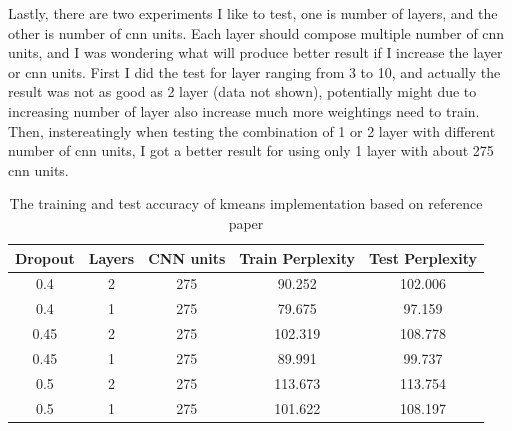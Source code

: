 \documentclass{article}
\begin{document}
Lastly, there are two experiments I like to test, one is number of layers, and the other is number of cnn units. Each layer should compose multiple number of cnn units, and I was wondering what will produce better result if I increase the layer or cnn units. First I did the test for layer ranging from 3 to 10, and actually the result was not as good as 2 layer (data not shown), potentially might due to increasing number of layer also increase much more weightings need to train. Then, instereatingly when testing the combination of 1 or 2 layer with different number of cnn units, I got a better result for using only 1 layer with about 275 cnn units.

\begin{table}[h]
\begin{center}
    \begin{tabular}{| c | c | c | c | c |}
    \hline
    Dropout & Layers & CNN units & Train Perplexity & Test Perplexity\\ \hline
    0.4 & 2 & 275 & 90.252 & 102.006 \\ \hline
    0.4 & 1 & 275 & 79.675 & 97.159 \\ \hline
    0.45 & 2 & 275 & 102.319 & 108.778 \\ \hline
    0.45 & 1 & 275 & 89.991 & 99.737 \\ \hline
    0.5 & 2 & 275 & 113.673 & 113.754 \\ \hline
    0.5 & 1 & 275 & 101.622 & 108.197 \\ \hline
    \end{tabular}
\end{center}
\caption{The training and test accuracy of kmeans implementation based on reference paper}
\end{table}
\end{document}
